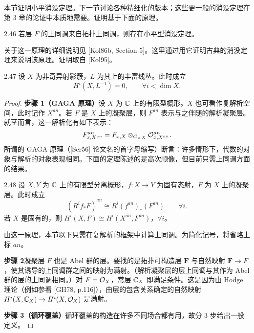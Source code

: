 本节证明小平消没定理。下一节讨论各种精细化的版本；这些更一般的消没定理在第 3 章的论证中本质地需要。证明基于下面的原理。

\begin{principle}{2.46}
若层 $F$ 的上同调来自拓扑上同调，则存在小平型消没定理。
\end{principle}

关于这一原理的详细说明见 [Kol86b, Section 5]。这里通过用它证明古典的消没定理来说明该原理。证明取自 [Kol95]。

\begin{theorem*}[小平消没定理]{2.47}
设 $X$ 为非奇异射影簇，$L$ 为其上的丰富线丛。此时成立
\[
H^i(X,L^{-1})=0,\qquad \forall i<\dim X.
\]
\end{theorem*}

\begin{proof}
\textbf{步骤 1（GAGA 原理）}\quad 设 $X$ 为 $\mathbb{C}$ 上的有限型概形。$X$ 也可看作复解析空间，此时记作 $X^{an}$。若 $F$ 是 $X$ 上的凝聚层，则 $F^{an}$ 表示与之伴随的解析凝聚层。就茎而言，这一解析化有如下表示：
\[
F^{an}_{x,X^{an}}=F_{x,X}\otimes_{\mathcal{O}_{x,X}}\mathcal{O}^{an}_{x,X^{an}}.
\]
所谓的 GAGA 原理（[Ser56] 论文名的首字母缩写）断言：许多情形下，代数的对象与解析的对象表现相同。下面的定理陈述的是高次顺像，但目前只需上同调方面的结果。

\begin{theorem}{2.48}
设 $X,Y$ 为 $\mathbb{C}$ 上的有限型分离概形，$f:X\to Y$ 为固有态射，$F$ 为 $X$ 上的凝聚层。此时成立
\[
(R^if_*F)^{an}\cong R^i(f^{an})_*(F^{an})\qquad\forall i.
\]
若 $X$ 是固有的，则 $H^i(X,F)\cong H^i(X^{an},F^{an})$，$\forall i$。
\end{theorem}

由这一原理，本节以下只需在复解析的框架中计算上同调。为简化记号，将省略上标 $an$。

\textbf{步骤 2}\quad 凝聚层 $F$ 也是 Abel 群的层。要找的是拓扑可构造层 $\mathbf{F}$ 与自然映射 $\mathbf{F}\to F$，使其诱导的上同调群之间的映射为满射。（解析凝聚层的层上同调与其作为 Abel 群的层的上同调相同。）对 $F=\mathcal{O}_X$，常层 $\mathbb{C}_X$ 即满足条件。这是因为由 Hodge 理论（例如参看 [GH78, p.116]），由层的包含关系确定的自然映射 $H^i(X,\mathbb{C}_X)\to H^i(X,\mathcal{O}_X)$ 是满射。

\textbf{步骤 3（循环覆盖）}\quad 循环覆盖的构造在许多不同场合都有用，故分 3 步给出一般定义。


\end{proof}
